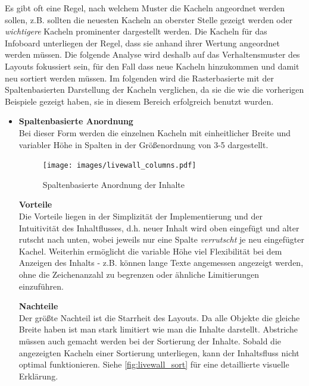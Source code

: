 \documentclass[12pt,twoside]{book}
\begin{document}
Es gibt oft eine Regel, nach welchem Muster die Kacheln angeordnet werden sollen, z.B. sollten die neuesten Kacheln an oberster Stelle gezeigt werden oder \textit{wichtigere} Kacheln prominenter dargestellt werden. Die Kacheln für das Infoboard unterliegen der Regel, dass sie anhand ihrer Wertung angeordnet werden müssen. Die folgende Analyse wird deshalb auf das Verhaltensmuster des Layouts fokussiert sein, für den Fall dass neue Kacheln hinzukommen und damit neu sortiert werden müssen.
Im folgenden wird die Rasterbasierte mit der Spaltenbasierten Darstellung der Kacheln verglichen, da sie die wie die vorherigen Beispiele gezeigt haben, sie in diesem Bereich erfolgreich benutzt wurden.

\begin{itemize}
  \item \textbf{Spaltenbasierte Anordnung} \\
  Bei dieser Form werden die einzelnen Kacheln mit einheitlicher Breite und variabler Höhe in Spalten in der Größenordnung von 3-5 dargestellt.

  \begin{figure}[htbp]
    \centering
    \texttt{[image: images/livewall\_columns.pdf]}
    \caption{Spaltenbasierte Anordnung der Inhalte}
    \label{fig:awesome_image}
  \end{figure}

  \textbf{Vorteile} \\
  Die Vorteile liegen in der Simplizität der Implementierung und der Intuitivität des Inhaltflusses, d.h. neuer Inhalt wird oben eingefügt und alter rutscht nach unten, wobei jeweils nur eine Spalte \textit{verrutscht} je neu eingefügter Kachel.
  Weiterhin ermöglicht die variable Höhe viel Flexibilität bei dem Anzeigen des Inhalts - z.B. können lange Texte angemessen angezeigt werden, ohne die Zeichenanzahl zu begrenzen oder ähnliche Limitierungen einzuführen.

  \textbf{Nachteile}\\
  Der größte Nachteil ist die Starrheit des Layouts. Da alle Objekte die gleiche Breite haben ist man stark limitiert wie man die Inhalte darstellt. Abstriche müssen auch gemacht werden bei der Sortierung der Inhalte. Sobald die angezeigten Kacheln einer Sortierung unterliegen, kann der Inhaltsfluss nicht optimal funktionieren. Siehe \ref{fig:livewall_sort} für eine detaillierte visuelle Erklärung.


\end{itemize}
\end{document}
